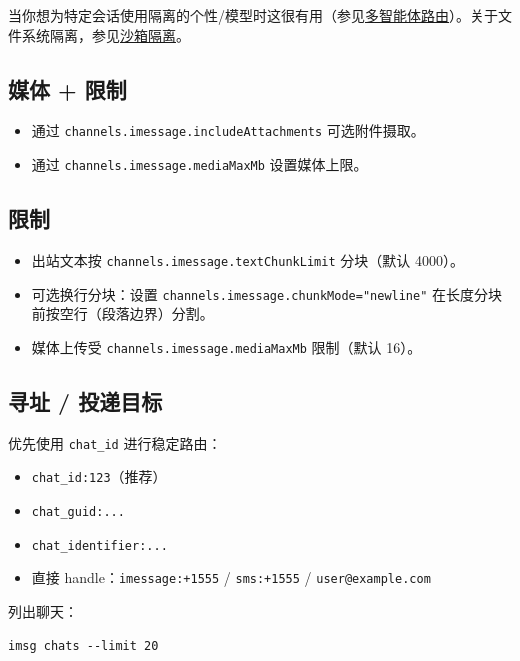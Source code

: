 当你想为特定会话使用隔离的个性/模型时这很有用（参见\href{/concepts/multi-agent}{多智能体路由}）。关于文件系统隔离，参见\href{/gateway/sandboxing}{沙箱隔离}。

\subsection{媒体 + 限制}


\begin{itemize}
  \item 通过 \texttt{channels.imessage.includeAttachments} 可选附件摄取。
  \item 通过 \texttt{channels.imessage.mediaMaxMb} 设置媒体上限。
\end{itemize}


\subsection{限制}


\begin{itemize}
  \item 出站文本按 \texttt{channels.imessage.textChunkLimit} 分块（默认 4000）。
  \item 可选换行分块：设置 \texttt{channels.imessage.chunkMode="newline"} 在长度分块前按空行（段落边界）分割。
  \item 媒体上传受 \texttt{channels.imessage.mediaMaxMb} 限制（默认 16）。
\end{itemize}


\subsection{寻址 / 投递目标}


优先使用 \texttt{chat\_id} 进行稳定路由：

\begin{itemize}
  \item \texttt{chat\_id:123}（推荐）
  \item \texttt{chat\_guid:...}
  \item \texttt{chat\_identifier:...}
  \item 直接 handle：\texttt{imessage:+1555} / \texttt{sms:+1555} / \texttt{user@example.com}
\end{itemize}


列出聊天：

\begin{lstlisting}
imsg chats --limit 20
\end{lstlisting}


